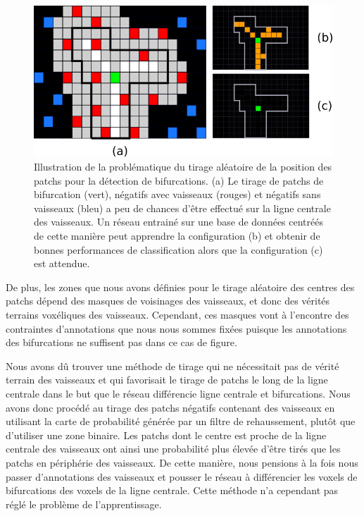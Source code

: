 \begin{figure}[!ht]
    \centering
    \includegraphics[width=\textwidth]{Images/exp_biais.png}
    \caption{Illustration de la problématique du tirage aléatoire de la position des patchs pour la détection de bifurcations. (a) Le tirage de patchs de bifurcation (vert), négatifs avec vaisseaux (rouges) et négatifs sans vaisseaux (bleu) a peu de chances d'être effectué sur la ligne centrale des vaisseaux. Un réseau entrainé sur une base de données centréés de cette manière peut apprendre la configuration (b) et obtenir de bonnes performances de classification alors que la configuration (c) est attendue.}
    \label{fig:exp_patchs}
\end{figure}

De plus, les zones que nous avons définies pour le tirage aléatoire des centres des patchs dépend des masques de voisinages des vaisseaux, et donc des vérités terrains voxéliques des vaisseaux. Cependant, ces masques vont à l'encontre des contraintes d'annotations que nous nous sommes fixées puisque les annotations des bifurcations ne suffisent pas dans ce cas de figure.

Nous avons dû trouver une méthode de tirage qui ne nécessitait pas de vérité terrain des vaisseaux et qui favorisait le tirage de patchs le long de la ligne centrale dans le but que le réseau différencie ligne centrale et bifurcations. Nous avons donc procédé au tirage des patchs négatifs contenant des vaisseaux en utilisant la carte de probabilité générée par un filtre de rehaussement, plutôt que d'utiliser une zone binaire. Les patchs dont le centre est proche de la ligne centrale des vaisseaux ont ainsi une probabilité plus élevée d'être tirés que les patchs en périphérie des vaisseaux. De cette manière, nous pensions à la fois nous passer d'annotations des vaisseaux et pousser le réseau à différencier les voxels de bifurcations des voxels de la ligne centrale. Cette méthode n'a cependant pas réglé le problème de l'apprentissage.

